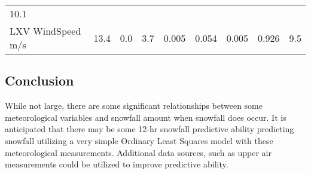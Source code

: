 \documentclass[11pt]{article}
\begin{document}
\begin{longtable}[]{@{}lllllllll@{}}
\begin{minipage}[t]{0.07\columnwidth}
10.1\strut
\end{minipage}\tabularnewline
\begin{minipage}[t]{0.25\columnwidth}\raggedright\strut
LXV WindSpeed m/s\strut
\end{minipage} & \begin{minipage}[t]{0.06\columnwidth}\raggedright\strut
13.4\strut
\end{minipage} & \begin{minipage}[t]{0.06\columnwidth}\raggedright\strut
0.0\strut
\end{minipage} & \begin{minipage}[t]{0.08\columnwidth}\raggedright\strut
3.7\strut
\end{minipage} & \begin{minipage}[t]{0.05\columnwidth}\raggedright\strut
0.005\strut
\end{minipage} & \begin{minipage}[t]{0.07\columnwidth}\raggedright\strut
0.054\strut
\end{minipage} & \begin{minipage}[t]{0.06\columnwidth}\raggedright\strut
0.005\strut
\end{minipage} & \begin{minipage}[t]{0.06\columnwidth}\raggedright\strut
0.926\strut
\end{minipage} & \begin{minipage}[t]{0.07\columnwidth}\raggedright\strut
9.5\strut
\end{minipage}\tabularnewline
\bottomrule
\end{longtable}

\subsection{Conclusion}\label{conclusion}

While not large, there are some significant relationships between some
meteorological variables and snowfall amount when snowfall does occur.
It is anticipated that there may be some 12-hr snowfall predictive
ability predicting snowfall utilizing a very simple Ordinary Least
Squares model with these meteorological measurements. Additional data
sources, such as upper air measurements could be utilized to improve
predictive ability.


    
    
    
    
\end{document}
